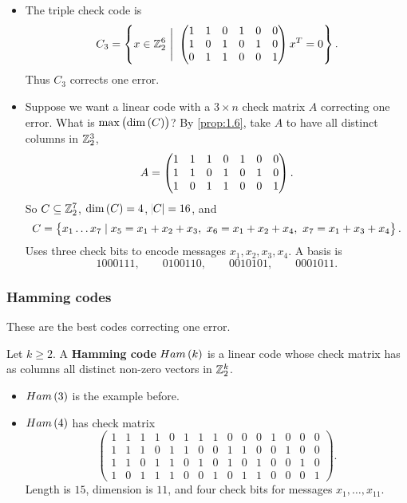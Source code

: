 \begin{example*}
\hfill
\begin{itemize}
\item The triple check code is
$$ C_3 = \cbr{x \in \Z_2^6 \ \Bigg| \ \threebythree{1 & 1}{0 & 1}{0 & 0}{1 & 0}{1 & 0}{1 & 0}{0 & 1}{1 & 0}{0 & 1}x^T = 0}. $$
Thus $ C_3 $ corrects one error.
\item Suppose we want a linear code with a $ 3 \times n $ check matrix $ A $ correcting one error. What is $ \max\br{\dim\br{C}} $? By \ref{prop:1.6}, take $ A $ to have all distinct columns in $ \mathbb{Z}_2^3 $,
$$ A = \begin{pmatrix} 1 & 1 & 1 & 0 & 1 & 0 & 0 \\ 1 & 1 & 0 & 1 & 0 & 1 & 0 \\ 1 & 0 & 1 & 1 & 0 & 0 & 1 \end{pmatrix}. $$
So $ C \subseteq \mathbb{Z}_2^7 $, $ \dim\br{C} = 4 $, $ \abs{C} = 16 $, and
$$ C = \cbr{x_1 \dots x_7 \mid x_5 = x_1 + x_2 + x_3, \ x_6 = x_1 + x_2 + x_4, \ x_7 = x_1 + x_3 + x_4}. $$
Uses three check bits to encode messages $ x_1, x_2, x_3, x_4 $. A basis is
$$ 1000111, \qquad 0100110, \qquad 0010101, \qquad 0001011. $$
\end{itemize}
\end{example*}

\pagebreak

\subsubsection{Hamming codes}


These are the best codes correcting one error.

\begin{definition*}
Let $ k \ge 2 $. A \textbf{Hamming code} $ Ham\br{k} $ is a linear code whose check matrix has as columns all distinct non-zero vectors in $ \mathbb{Z}_2^k $.
\end{definition*}

\setcounter{MaxMatrixCols}{15}

\begin{example*}
\hfill
\begin{itemize}
\item $ Ham\br{3} $ is the example before.
\item $ Ham\br{4} $ has check matrix
$$
\begin{pmatrix}
1 & 1 & 1 & 1 & 0 & 1 & 1 & 1 & 0 & 0 & 0 & 1 & 0 & 0 & 0 \\
1 & 1 & 1 & 0 & 1 & 1 & 0 & 0 & 1 & 1 & 0 & 0 & 1 & 0 & 0 \\
1 & 1 & 0 & 1 & 1 & 0 & 1 & 0 & 1 & 0 & 1 & 0 & 0 & 1 & 0 \\
1 & 0 & 1 & 1 & 1 & 0 & 0 & 1 & 0 & 1 & 1 & 0 & 0 & 0 & 1
\end{pmatrix}.
$$
Length is $ 15 $, dimension is $ 11 $, and four check bits for messages $ x_1, \dots, x_{11} $.
\end{itemize}
\end{example*}

